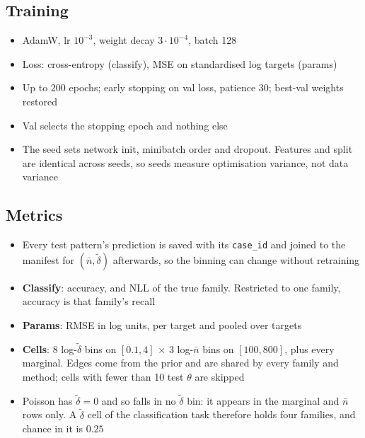\documentclass[11pt]{article}
\newcommand{\dt}{\tilde\delta}
\newcommand{\nb}{\bar n}
\begin{document}
\subsection*{Training}
\begin{itemize}
  \item AdamW, lr $10^{-3}$, weight decay $3\cdot10^{-4}$, batch 128
  \item Loss: cross-entropy (classify), MSE on standardised log targets (params)
  \item Up to 200 epochs; early stopping on val loss, patience 30; best-val weights restored
  \item Val selects the stopping epoch and nothing else
  \item The seed sets network init, minibatch order and dropout. Features and split are identical across seeds, so seeds measure optimisation variance, not data variance
\end{itemize}

\subsection*{Metrics}
\begin{itemize}
  \item Every test pattern's prediction is saved with its \texttt{case\_id} and joined to the manifest for $(\nb,\dt)$ afterwards, so the binning can change without retraining
  \item \textbf{Classify}: accuracy, and NLL of the true family. Restricted to one family, accuracy is that family's recall
  \item \textbf{Params}: RMSE in log units, per target and pooled over targets
  \item \textbf{Cells}: 8 log-$\dt$ bins on $[0.1,4]$ $\times$ 3 log-$\nb$ bins on $[100,800]$, plus every marginal. Edges come from the prior and are shared by every family and method; cells with fewer than 10 test $\theta$ are skipped
  \item Poisson has $\dt=0$ and so falls in no $\dt$ bin: it appears in the marginal and $\nb$ rows only. A $\dt$ cell of the classification task therefore holds four families, and chance in it is $0.25$
\end{itemize}
\end{document}
